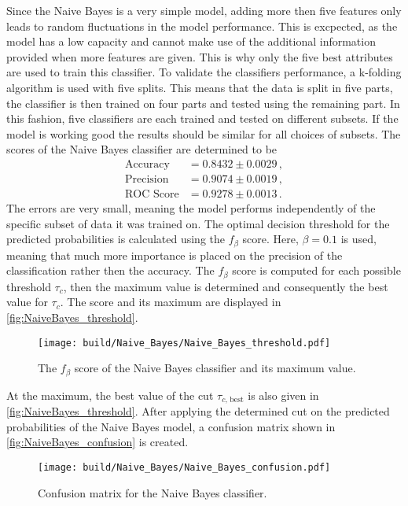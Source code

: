 Since the Naive Bayes is a very simple model, adding more then five features only leads to random
fluctuations in the model performance. This is excpected, as the model has a low capacity and
cannot make use of the additional information provided when more features are given.
This is why only the five best attributes are used to train this classifier.
To validate the classifiers performance, a k-folding algorithm is used with five splits.
This means that the data is split in five parts, the classifier is then trained on four parts and tested using
the remaining part. In this fashion, five classifiers are each trained and tested on different subsets.
If the model is working good the results should be similar for all choices of subsets.
The scores of the Naive Bayes classifier are determined to be
\begin{align*}
  \text{Accuracy} &= 0.8432\pm0.0029 \,, \\
  \text{Precision} &= 0.9074\pm0.0019 \,, \\
  \text{ROC Score} &= 0.9278\pm0.0013 \,.
\end{align*}
The errors are very small, meaning the model performs independently of the specific subset of data it was trained on.
The optimal decision threshold for the predicted probabilities is calculated using
the $f_\beta$ score. Here, $\beta=0.1$ is used, meaning that much more importance
is placed on the precision of the classification rather then the accuracy.
The $f_\beta$ score is computed for each possible threshold $\tau_c$, then
the maximum value is determined and consequently the best value for $\tau_c$.
The score and its maximum are displayed in \autoref{fig:NaiveBayes_threshold}.

\begin{figure}[H]
  \centering
  \texttt{[image: build/Naive\_Bayes/Naive\_Bayes\_threshold.pdf]}
  \caption{The $f_\beta$ score of the Naive Bayes classifier and its maximum value.}
  \label{fig:NaiveBayes_threshold}
\end{figure}

At the maximum, the best value of the cut $\tau_{c \text{, best}}$ is also given in \autoref{fig:NaiveBayes_threshold}.
After applying the determined cut on the predicted probabilities of the Naive Bayes model,
a confusion matrix shown in \autoref{fig:NaiveBayes_confusion} is created.

\begin{figure}[H]
  \centering
  \texttt{[image: build/Naive\_Bayes/Naive\_Bayes\_confusion.pdf]}
  \caption{Confusion matrix for the Naive Bayes classifier.}
  \label{fig:NaiveBayes_confusion}
\end{figure}

